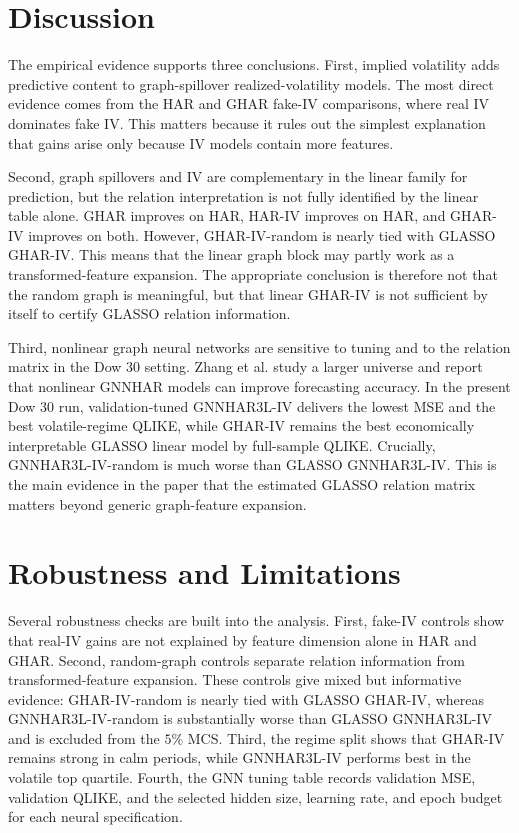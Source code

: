 \documentclass[11pt,a4paper]{article}
\begin{document}
\section{Discussion}

The empirical evidence supports three conclusions. First, implied volatility adds predictive
content to graph-spillover realized-volatility models. The most direct evidence comes from the
HAR and GHAR fake-IV comparisons, where real IV dominates fake IV. This matters because it
rules out the simplest explanation that gains arise only because IV models contain more
features.

Second, graph spillovers and IV are complementary in the linear family for prediction, but the
relation interpretation is not fully identified by the linear table alone. GHAR improves on HAR,
HAR-IV improves on HAR, and GHAR-IV improves on both. However, GHAR-IV-random is nearly
tied with GLASSO GHAR-IV. This means that the
linear graph block may partly work as a transformed-feature expansion. The appropriate conclusion
is therefore not that the random graph is meaningful, but that linear GHAR-IV is not sufficient
by itself to certify GLASSO relation information.

Third, nonlinear graph neural networks are sensitive to tuning and to the relation matrix in the
Dow 30 setting. Zhang et al. study a larger universe and report that nonlinear GNNHAR models
can improve forecasting accuracy. In the present Dow 30 run, validation-tuned GNNHAR3L-IV
delivers the lowest MSE and the best volatile-regime QLIKE, while GHAR-IV remains the best
economically interpretable GLASSO linear model by full-sample QLIKE. Crucially,
GNNHAR3L-IV-random is much worse than GLASSO GNNHAR3L-IV. This is the main evidence
in the paper that the estimated GLASSO relation matrix matters beyond generic graph-feature
expansion.

\section{Robustness and Limitations}

Several robustness checks are built into the analysis. First, fake-IV controls show that real-IV
gains are not explained by feature dimension alone in HAR and GHAR. Second, random-graph
controls separate relation information from transformed-feature expansion. These controls give
mixed but informative evidence: GHAR-IV-random is nearly tied with GLASSO GHAR-IV, whereas
GNNHAR3L-IV-random is substantially worse than GLASSO GNNHAR3L-IV and is excluded from
the \(5\%\) MCS. Third, the regime split shows that GHAR-IV remains strong in calm periods,
while GNNHAR3L-IV performs best in the volatile top quartile. Fourth, the GNN tuning table
records validation MSE, validation QLIKE, and the selected hidden size, learning rate, and
epoch budget for each neural specification.
\end{document}

